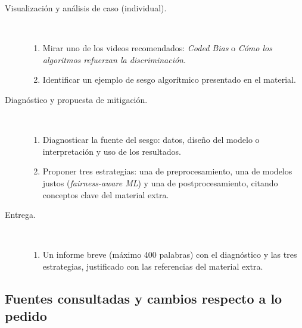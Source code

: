 \documentclass[11pt,letterpaper]{article}
\begin{document}
\begin{description}
    \item[Visualización y análisis de caso (individual).]\mbox{}\\[-1.3\baselineskip]
    \begin{enumerate}
        \item Mirar uno de los videos recomendados: \textit{Coded Bias} o \textit{Cómo los algoritmos refuerzan la discriminación}.
        \item Identificar un ejemplo de sesgo algorítmico presentado en el material.
    \end{enumerate}
    \item[Diagnóstico y propuesta de mitigación.]\mbox{}\\[-1.3\baselineskip]
    \begin{enumerate}
        \item Diagnosticar la fuente del sesgo: datos, diseño del modelo o interpretación y uso de los resultados.
        \item Proponer tres estrategias: una de preprocesamiento, una de modelos justos (\textit{fairness-aware ML}) y una de postprocesamiento, citando conceptos clave del material extra.
    \end{enumerate}
    \item[Entrega.]\mbox{}\\[-1.3\baselineskip]
    \begin{enumerate}
        \item Un informe breve (máximo 400 palabras) con el diagnóstico y las tres estrategias, justificado con las referencias del material extra.
    \end{enumerate}
\end{description}

\subsection*{Fuentes consultadas y cambios respecto a lo pedido}
\end{document}
